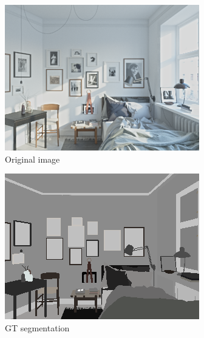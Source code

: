 \begin{figure}[H]
    \centering
    \begin{subfigure}{0.32\linewidth}
        \includegraphics[width=\linewidth]{praca/images/AI45_003_Cam01.png}
        \caption{Original image}
    \end{subfigure}
    \begin{subfigure}{0.32\linewidth}
        \includegraphics[width=\linewidth]{praca/images/AI45_003_Cam01.segmentation.png}
        \caption{GT segmentation}
    \end{subfigure}
    \begin{subfigure}{0.32\linewidth}

\end{subfigure}
\end{figure}
